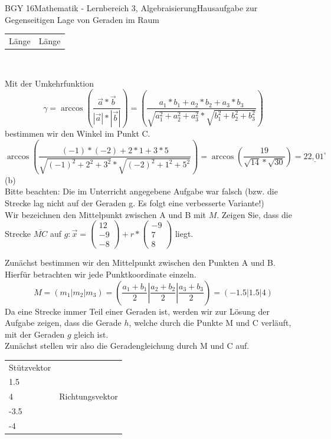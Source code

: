 \documentclass[oneside,openany,headings=optiontotoc,11pt,numbers=noenddot]{scrreprt}
\begin{document}
\begin{worksheet}{BGY 16}{Mathematik - Lernbereich 3, Algebraisierung}{Hausaufgabe zur Gegenseitigen Lage von Geraden im Raum}
\begin{framed}
\begin{tabularx}{\textwidth}{XX}
				Länge & Länge
			\end{tabularx}\\
			\par\noindent
			Mit der Umkehrfunktion \[\gamma = \arccos\left(\frac{\vec{a}*\vec{b}}{|\vec{a}|*|\vec{b}|}\right) = \left(\frac{a_1*b_1 + a_2*b_2 + a_3*b_3}{\sqrt{a_1^2 + a_2^2 + a_3^2}*\sqrt{b_1^2 + b_2^2 + b_3^2}}\right)\] bestimmen wir den Winkel im Punkt C.\\
			\[\arccos\left(\frac{(-1)*(-2) + 2*1 + 3*5}{\sqrt{(-1)^2+2^2+3^2}*\sqrt{(-2)^2+1^2+5^2}}\right) = \arccos\left(\frac{19}{\sqrt{14}*\sqrt{30}}\right) = \underline{22,01^\circ}\]
			(b)\\
			\small\color{red}Bitte beachten: Die im Unterricht angegebene Aufgabe war falsch (bzw. die Strecke lag nicht auf der Geraden g. Es folgt eine verbesserte Variante!)\\
			\normalcolor\normalsize
			Wir bezeichnen den Mittelpunkt zwischen A und B mit \(M\). Zeigen Sie, dass die Strecke \(\overline{MC}\) auf \(g: \vec{x} = \left(\begin{array}{c}12\\-9\\-8\end{array}\right) + r*\left(\begin{array}{c}-9\\7\\8\end{array}\right)\) liegt.\\
			\par\bigskip\noindent
			Zunächst bestimmen wir den Mittelpunkt zwischen den Punkten A und B. Hierfür betrachten wir jede Punktkoordinate einzeln. \[M =(m_1|m_2|m_3) = \left(\frac{a_1+b_1}{2}|\frac{a_2+b_2}{2}|\frac{a_3+b_3}{2}\right) = \left(-1.5|1.5|4\right)\]
			Da eine Strecke immer Teil einer Geraden ist, werden wir zur Lösung der Aufgabe zeigen, dass die Gerade \(h\), welche durch die Punkte M und C verläuft, mit der Geraden \(g\) gleich ist.\\
			Zunächst stellen wir also die Geradengleichung durch M und C auf.\\
			\begin{tabularx}{\textwidth}{XX}
				Stützvektor \(\vec{0M} = \left(\begin{array}{c}-1.5\\1.5\\4\end{array}\right)\) & Richtungsvektor \(\vec{MC} = \vec{C}\vec{M} = \left(\begin{array}{c}4.5\\-3.5\\-4\end{array}\right)\)\\

\end{tabularx}
\end{framed}
\end{worksheet}
\end{document}
